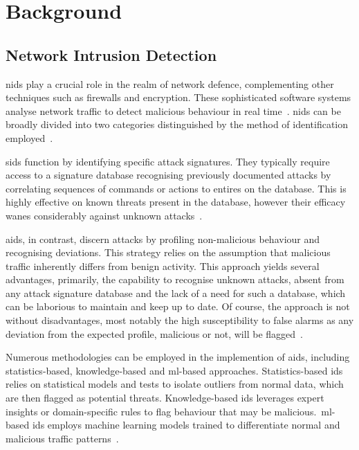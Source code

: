 \chapter{Background}%
\label{chp:background}

\section{Network Intrusion Detection}%
\label{sec:nids}

\gls{nids} play a crucial role in the realm of network defence, complementing
other techniques such as firewalls and encryption. These sophisticated software
systems analyse network traffic to detect malicious behaviour in real time~\cite{survey2}.
\gls{nids} can be broadly divided into two categories distinguished by the
method of identification employed~\cite{survey1}.

\gls{sids} function by identifying specific attack signatures. They typically
require access to a signature database recognising previously documented
attacks by correlating sequences of commands or actions to entires on the
database. This is highly effective on known threats present in the database,
however their efficacy wanes considerably against unknown attacks~\cite{survey1, survey2}.

\gls{aids}, in contrast, discern attacks by profiling non-malicious behaviour
and recognising deviations. This strategy relies on the assumption that
malicious traffic inherently differs from benign activity. This approach yields
several advantages, primarily, the capability to recognise unknown attacks,
absent from any attack signature database and the lack of a need for such a
database, which can be laborious to maintain and keep up to date. Of course,
the approach is not without disadvantages, most notably the high susceptibility
to false alarms as any deviation from the expected profile, malicious or not,
will be flagged~\cite{survey1, survey2}.

Numerous methodologies can be employed in the implemention of \gls{aids},
including statistics-based, knowledge-based and \gls{ml}-based approaches.
Statistics-based \gls{ids} relies on statistical models and tests to isolate
outliers from normal data, which are then flagged as potential threats.
Knowledge-based \gls{ids} leverages expert insights or domain-specific rules to
flag behaviour that may be malicious.\ \gls{ml}-based \gls{ids} employs machine
learning models trained to differentiate normal and malicious traffic
patterns~\cite{survey1}.

